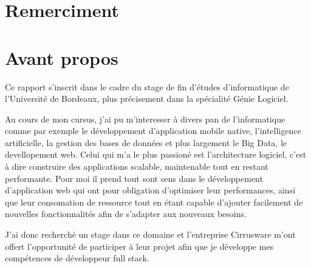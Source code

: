 \section{Remerciment}

\newpage
\section{Avant propos}
Ce rapport s'inscrit dans le cadre du stage de fin d'études d'informatique de l'Université de Bordeaux, plus précisement dans la spécialité Génie Logiciel.

Au cours de mon cursus, j'ai pu m'interesser à divers pan de l'informatique comme par exemple le développement d'application mobile native, l'intelligence artificielle, la gestion des bases de données et plus largement le Big Data, le devellopement web. Celui qui m'a le plus passioné est l'architecture logiciel, c'est à dire construire des applications scalable, maintenable tout en restant performante. Pour moi il prend tout sont sens dans le développement d'application web qui ont pour obligation d'optimiser leur performances, ainsi que leur consomation de ressource tout en étant capable d'ajouter facilement de nouvelles fonctionnalités afin de s'adapter aux nouveaux besoins.

J'ai donc recherché un stage dans ce domaine et l'entreprise Cirrusware m'ont offert l'opportunité de participer à leur projet afin que je développe mes compétences de développeur full stack. 





